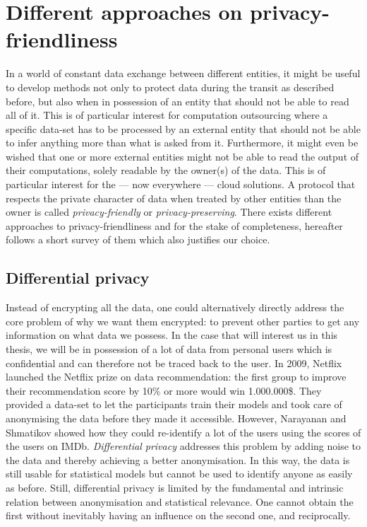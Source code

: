 \section{Different approaches on privacy-friendliness}
In a world of constant data exchange between different entities, it might be useful to develop methods not only to protect data during the transit as described before, but also when in possession of an entity that should not be able to read all of it. This is of particular interest for computation outsourcing where a specific data-set has to be processed by an external entity that should not be able to infer anything more than what is asked from it. Furthermore, it might even be wished that one or more external entities might not be able to read the output of their computations, solely readable by the owner(s) of the data. This is of particular interest for the --- now everywhere --- cloud solutions. A protocol that respects the private character of data when treated by other entities than the owner is called \emph{privacy-friendly} or \emph{privacy-preserving}. There exists different approaches to privacy-friendliness and for the stake of completeness, hereafter follows a short survey of them which also justifies our choice.

\subsection{Differential privacy}
Instead of encrypting all the data, one could alternatively directly address the core problem of why we want them encrypted: to prevent other parties to get any information on what data we possess. In the case that will interest us in this thesis, we will be in possession of a lot of data from personal users which is confidential and can therefore not be traced back to the user. In 2009, Netflix launched the Netflix prize on data recommendation: the first group to improve their recommendation score by 10\% or more would win 1.000.000\$. They provided a data-set to let the participants train their models and took care of anonymising the data before they made it accessible. However, Narayanan and Shmatikov showed how they could re-identify a lot of the users using the scores of the users on IMDb. \emph{Differential privacy} \cite{Dwork2008DifferentialResults} addresses this problem by adding noise to the data and thereby achieving a better anonymisation. In this way, the data is still usable for statistical models but cannot be used to identify anyone as easily as before. Still, differential privacy is limited by the fundamental and intrinsic relation between anonymisation and statistical relevance. One cannot obtain the first without inevitably having an influence on the second one, and reciprocally.

